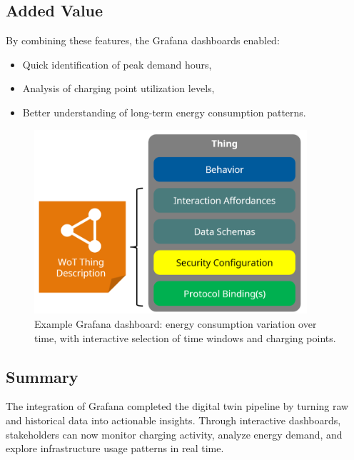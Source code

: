 \subsection*{Added Value}
By combining these features, the Grafana dashboards enabled:
\begin{itemize}
    \item Quick identification of peak demand hours,
    \item Analysis of charging point utilization levels,
    \item Better understanding of long-term energy consumption patterns.
\end{itemize}

\begin{figure}[ht!]
    \centering
    \includegraphics[width=0.9\textwidth]{Images/td.png}
    \caption{Example Grafana dashboard: energy consumption variation over time, with interactive selection of time windows and charging points.}
    \label{fig:grafana_dashboard}
\end{figure}

\subsection*{Summary}
The integration of Grafana completed the digital twin pipeline by turning raw and historical data into actionable insights.  
Through interactive dashboards, stakeholders can now monitor charging activity, analyze energy demand, and explore infrastructure usage patterns in real time.



